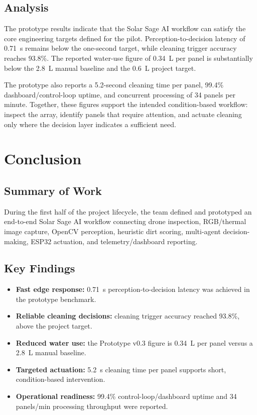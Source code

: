 \documentclass[12pt]{report}
\begin{document}
\section{Analysis}

The prototype results indicate that the Solar Sage AI workflow can satisfy the core engineering targets defined for the pilot. Perception-to-decision latency of 0.71~s remains below the one-second target, while cleaning trigger accuracy reaches 93.8\%. The reported water-use figure of 0.34~L per panel is substantially below the 2.8~L manual baseline and the 0.6~L project target.

The prototype also reports a 5.2-second cleaning time per panel, 99.4\% dashboard/control-loop uptime, and concurrent processing of 34 panels per minute. Together, these figures support the intended condition-based workflow: inspect the array, identify panels that require attention, and actuate cleaning only where the decision layer indicates a sufficient need.

\chapter{Conclusion}

\section{Summary of Work}

During the first half of the project lifecycle, the team defined and prototyped an end-to-end Solar Sage AI workflow connecting drone inspection, RGB/thermal image capture, OpenCV perception, heuristic dirt scoring, multi-agent decision-making, ESP32 actuation, and telemetry/dashboard reporting.

\section{Key Findings}

\begin{itemize}[leftmargin=*]
    \item \textbf{Fast edge response:} 0.71~s perception-to-decision latency was achieved in the prototype benchmark.
    \item \textbf{Reliable cleaning decisions:} cleaning trigger accuracy reached 93.8\%, above the project target.
    \item \textbf{Reduced water use:} the Prototype v0.3 figure is 0.34~L per panel versus a 2.8~L manual baseline.
    \item \textbf{Targeted actuation:} 5.2~s cleaning time per panel supports short, condition-based intervention.
    \item \textbf{Operational readiness:} 99.4\% control-loop/dashboard uptime and 34 panels/min processing throughput were reported.
\end{itemize}
\end{document}
